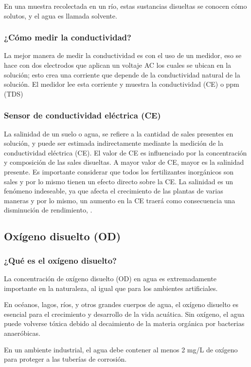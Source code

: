 En una muestra recolectada en un r\'io, estas sustancias disueltas se conocen cómo solutos, y el agua es llamada solvente.

\subsubsection{¿Cómo medir la conductividad?}
La mejor manera de medir la conductividad es con el uso de un medidor, eso se hace con dos electrodos que aplican un voltaje AC los cuales se ubican en la solución; esto crea una corriente que depende de la conductividad natural de la solución. 
El medidor lee esta corriente y muestra la conductividad (CE) o ppm (TDS)

\subsubsection{Sensor de conductividad eléctrica (CE) }
La salinidad de un suelo o agua, se refiere a la cantidad de sales presentes en solución, y puede ser estimada indirectamente mediante la medición de la conductividad eléctrica (CE). 
El valor de CE es influenciado por la concentración y composición de las sales disueltas.
A mayor valor de CE, mayor es la salinidad presente. 
Es importante considerar que todos los fertilizantes inorgánicos son sales y por lo mismo tienen un efecto directo sobre la CE.
La salinidad es un fenómeno indeseable, ya que afecta el crecimiento de las plantas de varias maneras y por lo mismo, un aumento en la CE traerá como consecuencia una disminución de rendimiento, \cite{rebolledo_v_conductividad_2017}.

\subsection{Oxígeno disuelto (OD)}
\subsubsection{¿Qué es el oxígeno disuelto?}
La concentración de oxígeno disuelto (OD) en agua es extremadamente importante en la naturaleza, al igual que para los ambientes artificiales. 

En océanos, lagos, ríos, y otros grandes cuerpos de agua, el oxígeno disuelto es esencial para el crecimiento y desarrollo de la vida acuática. Sin oxígeno, el agua puede volverse tóxica debido al decaimiento de la materia orgánica por bacterias anaeróbicas. 

En un ambiente industrial, el agua debe contener al menos 2 mg/L de oxígeno para proteger a las tuberías de corrosión.  

